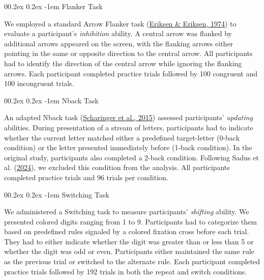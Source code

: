\documentclass[
  man]{apa7}
\makeatletter
\let\oldparagraph\paragraph
\renewcommand{\paragraph}[1]{\oldparagraph{#1}\mbox{}}
\renewcommand{\paragraph}{\@startsection{paragraph}{4}{\parindent}%
  {0\baselineskip \@plus 0.2ex \@minus 0.2ex}%
  {-1em}%
  {\normalfont\normalsize\bfseries\itshape\typesectitle}}
\renewcommand{\paragraph}{\@startsection{paragraph}{4}{\parindent}%
  {0\baselineskip \@plus 0.2ex \@minus 0.2ex}%
  {-1em}%
  {\normalfont\normalsize\bfseries\typesectitle}}
\makeatother
\begin{document}
\hypertarget{flanker-task}{%
\paragraph{Flanker Task}\label{flanker-task}}

We employed a standard Arrow Flanker task (\protect\hyperlink{ref-eriksen1974effects}{Eriksen \& Eriksen, 1974}) to evaluate a participant's \emph{inhibition} ability. A central arrow was flanked by additional arrows appeared on the screen, with the flanking arrows either pointing in the same or opposite direction to the central arrow. All participants had to identify the direction of the central arrow while ignoring the flanking arrows. Each participant completed practice trials followed by 100 congruent and 100 incongruent trials.

\hypertarget{nback-task}{%
\paragraph{Nback Task}\label{nback-task}}

An adapted Nback task (\protect\hyperlink{ref-scharinger2015flanker}{Scharinger et al., 2015}) assessed participants' \emph{updating} abilities. During presentation of a stream of letters, participants had to indicate whether the current letter matched either a predefined target-letter (0-back condition) or the letter presented immediately before (1-back condition). In the original study, participants also completed a 2-back condition. Following Sadus et al. (\protect\hyperlink{ref-sadus2024explorative}{2024}), we excluded this condition from the analysis. All participants completed practice trials and 96 trials per condition.

\hypertarget{switching-task}{%
\paragraph{Switching Task}\label{switching-task}}

We administered a Switching task to measure participants' \emph{shifting} ability. We presented colored digits ranging from 1 to 9. Participants had to categorize them based on predefined rules signaled by a colored fixation cross before each trial. They had to either indicate whether the digit was greater than or less than 5 or whether the digit was odd or even. Participants either maintained the same rule as the previous trial or switched to the alternate rule. Each participant completed practice trials followed by 192 trials in both the repeat and switch conditions.
\end{document}
